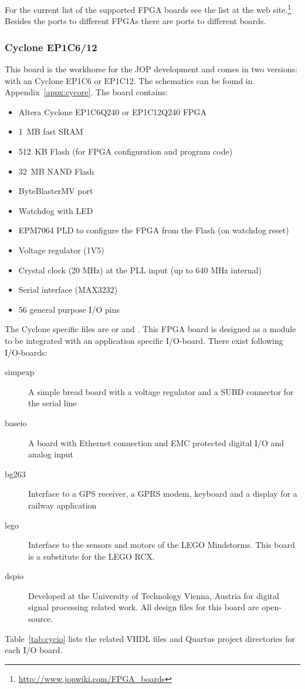 For the current list of the supported FPGA boards see the list at the
web site.\footnote{\url{http://www.jopwiki.com/FPGA_boards}} Besides
the ports to different FPGAs there are ports to different boards.

\subsubsection{Cyclone EP1C6/12}

This board is the workhorse for the JOP development and comes in two
versions: with an Cyclone EP1C6 or EP1C12. The schematics can be
found in Appendix~\ref{appx:cycore}. The board contains:

\begin{itemize}
    \item Altera Cyclone EP1C6Q240 or EP1C12Q240 FPGA
    \item 1~MB fast SRAM
    \item 512~KB Flash (for FPGA configuration and program code)
    \item 32~MB NAND Flash
    \item ByteBlasterMV port
    \item Watchdog with LED
    \item EPM7064 PLD to configure the FPGA from the Flash (on watchdog reset)
    \item Voltage regulator (1V5)
    \item Crystal clock (20 MHz) at the PLL input (up to 640 MHz internal)
    \item Serial interface (MAX3232)
    \item 56 general purpose I/O pins
\end{itemize}

The Cyclone specific files are  or 
and . This FPGA board is designed as a module to be
integrated with an application specific I/O-board. There exist
following I/O-boards:
%
\begin{description}
    \item[simpexp] A simple bread board with a voltage regulator and
    a SUBD connector for the serial line
    \item[baseio] A board with Ethernet connection and EMC
        protected digital I/O and analog input
    \item[bg263] Interface to a GPS receiver, a GPRS modem, keyboard
    and a display for a railway application
    \item[lego] Interface to the sensors and motors of the LEGO
    Mindstorms. This board is a substitute for the LEGO RCX.
    \item[dspio] Developed at the University of Technology Vienna, Austria for
    digital signal processing related work. All design files for this
    board are open-source.
\end{description}
%
Table~\ref{tab:cycio} lists the related VHDL files and Quartus
project directories for each I/O board.

